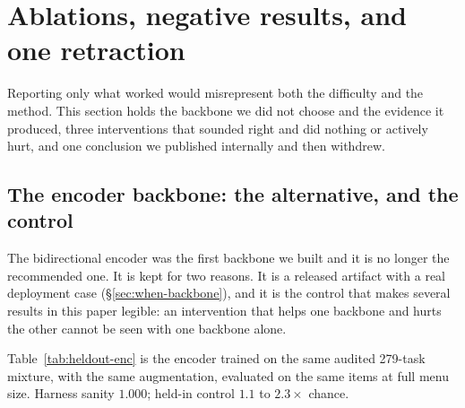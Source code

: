 \section{Ablations, negative results, and one retraction}
\label{sec:ablations}

Reporting only what worked would misrepresent both the difficulty and the
method. This section holds the backbone we did not choose and the
evidence it produced, three interventions that sounded right and did
nothing or actively hurt, and one conclusion we published internally and
then withdrew.

\subsection{The encoder backbone: the alternative, and the control}
\label{sec:abl-encoder}

The bidirectional encoder was the first backbone we built and it is no
longer the recommended one. It is kept for two reasons. It is a released
artifact with a real deployment case (\S\ref{sec:when-backbone}), and it
is the control that makes several results in this paper legible: an
intervention that helps one backbone and hurts the other cannot be seen
with one backbone alone.

Table~\ref{tab:heldout-enc} is the encoder trained on the same audited
279-task mixture, with the same augmentation, evaluated on the same items
at full menu size. Harness sanity $1.000$; held-in control $1.1$ to
$2.3\times$ chance.

